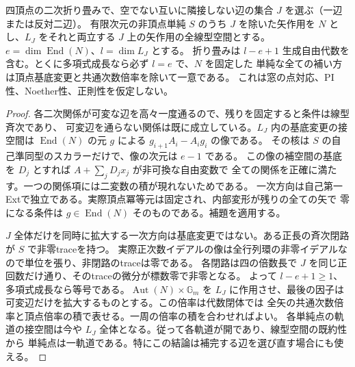 \begin{theorem}\label{thm:simple-linear-completion-growth}
四頂点の二次折り畳みで、空でない互いに隣接しない辺の集合 $J$ を選ぶ（一辺または反対二辺）。
有限次元の非頂点単純 $S$ のうち $J$ を除いた矢作用を $N$ とし、$L_J$ をそれと両立する
$J$ 上の矢作用の全線型空間とする。$e=\dim\operatorname{End}(N)$、$l=\dim L_J$ とする。
折り畳みは $l-e+1$ 生成自由代数を含む。とくに多項式成長なら必ず $l=e$ で、$N$ を固定した
単純な全ての補い方は頂点基底変更と共通次数倍率を除いて一意である。
これは窓の点対応、PI性、Noether性、正則性を仮定しない。
\end{theorem}
\begin{proof}
各二次関係が可変な辺を高々一度通るので、残りを固定すると条件は線型斉次であり、
可変辺を通らない関係は既に成立している。$L_J$ 内の基底変更の接空間は
$\operatorname{End}(N)$ の元 $g$ による $g_{i+1}A_i-A_i g_i$ の像である。
その核は $S$ の自己準同型のスカラーだけで、像の次元は $e-1$ である。
この像の補空間の基底を $D_j$ とすれば $A+\sum_jD_j x_j$ が非可換な自由変数で
全ての関係を正確に満たす。一つの関係項には二変数の積が現れないためである。
一次方向は自己第一Extで独立である。実際頂点冪等元は固定され、内部変形が残りの全ての矢で
零になる条件は $g\in\operatorname{End}(N)$ そのものである。補題を適用する。

$J$ 全体だけを同時に拡大する一次方向は基底変更ではない。ある正長の斉次閉路が $S$ で非零traceを持つ。
実際正次数イデアルの像は全行列環の非零イデアルなので単位を張り、非閉路のtraceは零である。
各閉路は四の倍数長で $J$ を同じ正回数だけ通り、そのtraceの微分が標数零で非零となる。
よって $l-e+1\ge1$、多項式成長なら等号である。$\operatorname{Aut}(N)\times\mathbb G_m$ を
$L_J$ に作用させ、最後の因子は可変辺だけを拡大するものとする。この倍率は代数閉体では
全矢の共通次数倍率と頂点倍率の積で表せる。一周の倍率の積を合わせればよい。
各単純点の軌道の接空間は今や $L_J$ 全体となる。従って各軌道が開であり、線型空間の既約性から
単純点は一軌道である。特にこの結論は補完する辺を選び直す場合にも使える。
\end{proof}

